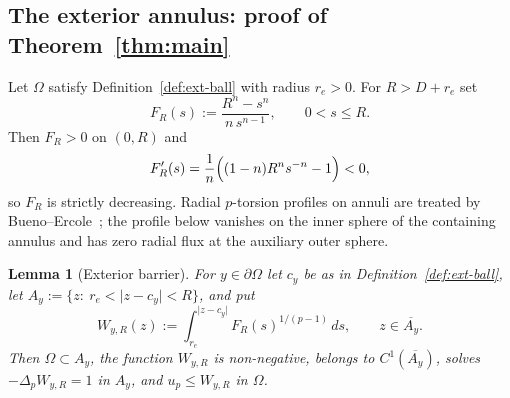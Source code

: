 \documentclass[11pt]{article}
\newcommand{\abs}[1]{\lvert #1\rvert}
\newtheorem{lemma}[theorem]{Lemma}
\theoremstyle{definition}
\theoremstyle{remark}
\begin{document}
\subsection{The exterior annulus: proof of Theorem~\ref{thm:main}}
\label{subsec:pointwise-upper}
Let $\Omega$ satisfy Definition~\ref{def:ext-ball} with radius $r_e>0$. For
$R>D+r_e$ set
\begin{equation}\label{eq:F}
F_R(s):=\frac{R^n-s^n}{n\,s^{n-1}},
\qquad 0<s\le R .
\end{equation}
Then $F_R>0$ on $(0,R)$ and
\begin{equation}\label{eq:F-decreasing}
F_R'(s)=\frac1n\Bigl((1-n)R^ns^{-n}-1\Bigr)<0,
\end{equation}
so $F_R$ is strictly decreasing. Radial $p$-torsion profiles on annuli are
treated by Bueno--Ercole~\cite{BE2015}; the profile below vanishes on the inner
sphere of the containing annulus and has zero radial flux at the auxiliary
outer sphere.
\begin{lemma}[Exterior barrier]\label{lem:barrier}
For $y\in\partial\Omega$ let $c_y$ be as in Definition~\ref{def:ext-ball}, let
$A_y:=\{z:\ r_e<\abs{z-c_y}<R\}$, and put
\begin{equation}\label{eq:W}
W_{y,R}(z):=\int_{r_e}^{\abs{z-c_y}}F_R(s)^{1/(p-1)}\,ds,
\qquad z\in\overline{A_y}.
\end{equation}
Then $\Omega\subset A_y$, the function $W_{y,R}$ is non-negative, belongs to
$C^1(\overline{A_y})$, solves $-\Delta_pW_{y,R}=1$ in $A_y$, and
$u_p\le W_{y,R}$ in $\Omega$.
\end{lemma}
\end{document}
